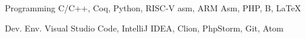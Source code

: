 

\begin{cvskills}

  \cvskill
    {Programming} %
    {C/C++, Coq, Python, RISC-V asm, ARM Asm, PHP, B, \LaTeX} %

  \cvskill
    {Dev. Env.} %
    {Visual Studio Code, IntelliJ IDEA, Clion, PhpStorm, Git, Atom} %

\end{cvskills}
